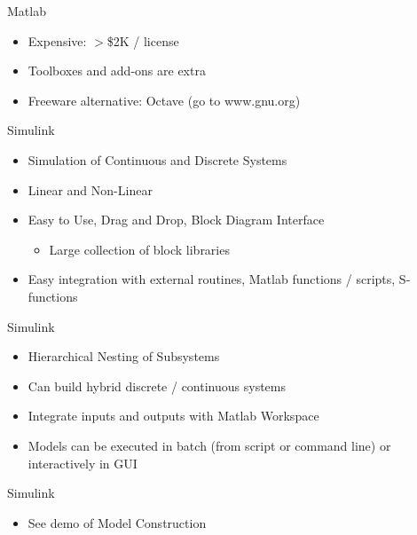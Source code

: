 \begin{frame}
Matlab
\begin{itemize}
  \item Expensive: $>$\$2K / license
  \item Toolboxes and add-ons are extra
  \item Freeware alternative:  Octave (go to www.gnu.org)
\end{itemize} 
\end{frame}

\begin{frame}
Simulink
\begin{itemize}
  \item Simulation of Continuous and Discrete Systems
  \item Linear and Non-Linear
  \item Easy to Use, Drag and Drop, Block Diagram Interface
	\begin{itemize}
		\item Large collection of block libraries
	\end{itemize}
  \item Easy integration with external routines, Matlab functions / scripts, S-functions
\end{itemize} 
\end{frame}

\begin{frame}
Simulink
\begin{itemize}
  \item Hierarchical Nesting of Subsystems
  \item Can build hybrid discrete / continuous systems
  \item Integrate inputs and outputs with Matlab Workspace
  \item Models can be executed in batch (from script or command line) or interactively in GUI
\end{itemize} 
\end{frame}

\begin{frame}
Simulink
\begin{itemize}
  \item See demo of Model Construction
\end{itemize} 
\end{frame}
